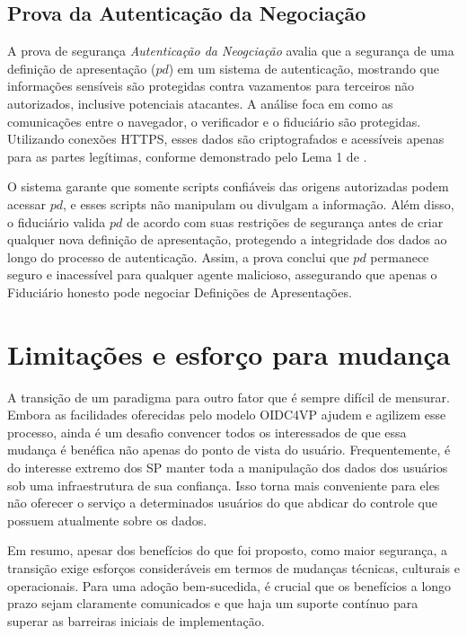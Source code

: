 \subsection{Prova da Autenticação da Negociação}

A prova de segurança \emph{Autenticação da Neogciação} avalia que a segurança de uma definição de apresentação ($pd$) em um sistema de autenticação, mostrando que informações sensíveis são protegidas contra vazamentos para terceiros não autorizados, inclusive potenciais atacantes. A análise foca em como as comunicações entre o navegador, o verificador e o fiduciário são protegidas. Utilizando conexões HTTPS, esses dados são criptografados e acessíveis apenas para as partes legítimas, conforme demonstrado pelo Lema 1 de .

O sistema garante que somente scripts confiáveis das origens autorizadas podem acessar $pd$, e esses scripts não manipulam ou divulgam a informação. Além disso, o fiduciário valida $pd$ de acordo com suas restrições de segurança antes de criar qualquer nova definição de apresentação, protegendo a integridade dos dados ao longo do processo de autenticação. Assim, a prova conclui que $pd$ permanece seguro e inacessível para qualquer agente malicioso, assegurando que apenas o Fiduciário honesto pode negociar Definições de Apresentações.

\section{Limitações e esforço para mudança}\label{section:limitacoes-esforco}

A transição de um paradigma para outro fator que é sempre difícil de mensurar. Embora as facilidades oferecidas pelo modelo \acs{OIDC4VP} ajudem e agilizem esse processo, ainda é um desafio convencer todos os interessados de que essa mudança é benéfica não apenas do ponto de vista do usuário. Frequentemente, é do interesse extremo dos \acs{SP} manter toda a manipulação dos dados dos usuários sob uma infraestrutura de sua confiança. Isso torna mais conveniente para eles não oferecer o serviço a determinados usuários do que abdicar do controle que possuem atualmente sobre os dados.

\textbf{}\textbf{}Em resumo, apesar dos benefícios do que foi proposto, como maior segurança, a transição exige esforços consideráveis em termos de mudanças técnicas, culturais e operacionais. Para uma adoção bem-sucedida, é crucial que os benefícios a longo prazo sejam claramente comunicados e que haja um suporte contínuo para superar as barreiras iniciais de implementação.